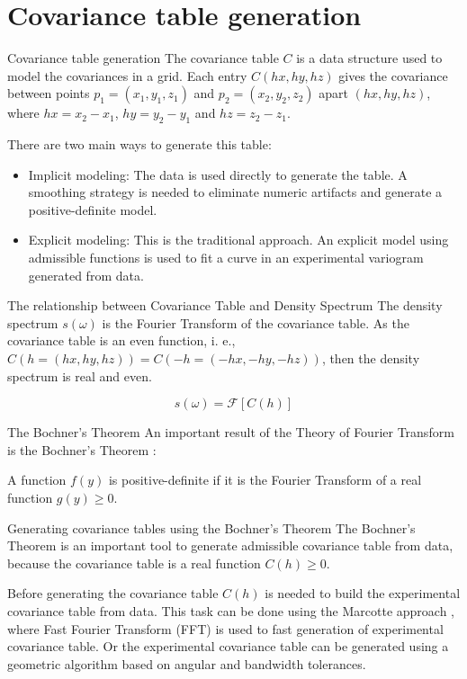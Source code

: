 \section{Covariance table generation}
\begin{frame}{Covariance table generation}
The covariance table $C$ is a data structure used to model the covariances in a grid. Each entry $C(hx,hy,hz)$ gives the covariance between points $p_1 = (x_1, y_1, z_1)$ and $p_2 = (x_2, y_2, z_2)$ apart $(hx, hy, hz)$, where $hx = x_2 - x_1$, $hy = y_2 - y_1$ and $hz = z_2 - z_1$.

There are two main ways to generate this table:
\begin{itemize}
	\item Implicit modeling: The data is used directly to generate the table. A smoothing strategy is needed to eliminate numeric artifacts and generate a positive-definite model\cite{cov.paper}.
    \item Explicit modeling: This is the traditional approach. An explicit model using admissible functions is used to fit a curve in an experimental variogram generated from data.
\end{itemize}
\end{frame}

\begin{frame}{The relationship between Covariance Table and Density Spectrum}
The density spectrum $s(\omega)$ is the Fourier Transform of the covariance table. As the covariance table is an even function, i. e., $C(h=(hx,hy,hz))=C(-h=(-hx,-hy,-hz))$, then the density spectrum is real and even.

$$
s(\omega)=\mathscr{F}\left[ C(h) \right]
$$
\end{frame}

\begin{frame}{The Bochner's Theorem}
An important result of the Theory of Fourier Transform is the Bochner's Theorem \cite{bochner1939additive}:

\begin{block}{}
A function $f(y)$ is positive-definite if it is the Fourier Transform of a real function $g(y) \geq 0$.
\end{block}
\end{frame}

\begin{frame}{Generating covariance tables using the Bochner's Theorem}
The Bochner's Theorem is an important tool to generate admissible covariance table from data, because the covariance table is a real function $C(h) \geq 0$.

Before generating the covariance table $C(h)$ is needed to build the experimental covariance table from data. This task can be done using the Marcotte approach \cite{fast.var.paper}, where Fast Fourier Transform (FFT) \cite{johnson2008implementing} is used to fast generation of experimental covariance table. Or the experimental covariance table can be generated using a geometric algorithm based on angular and bandwidth tolerances. 
\end{frame}


